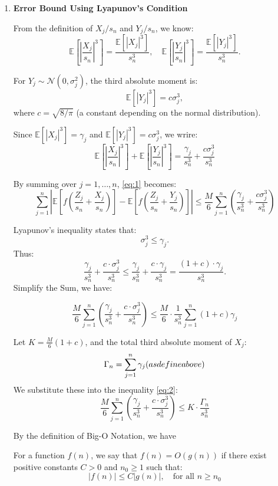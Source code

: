\begin{itemize}
\begin{enumerate}
\item \textbf{Error Bound Using Lyapunov's Condition}

From the definition of \( X_j / s_n \) and \( Y_j / s_n \), we know:
     \[
     \mathbb{E}\left[\left|\frac{X_j}{s_n}\right|^3\right] = \frac{\mathbb{E}[|X_j|^3]}{s_n^3}, \quad \mathbb{E}\left[\left|\frac{Y_j}{s_n}\right|^3\right] = \frac{\mathbb{E}[|Y_j|^3]}{s_n^3}.
     \]

For \( Y_j \sim \mathcal{N}(0, \sigma_j^2) \), the third absolute moment is:
     \[
     \mathbb{E}[|Y_j|^3] = c \sigma_j^3,
     \]
     where \( c = \sqrt{8 / \pi} \) (a constant depending on the normal distribution).

Since \( \mathbb{E}[|X_j|^3] = \gamma_j \) and \(\mathbb{E}[|Y_j|^3] = c \sigma_j^3\), we wrire:
     \[
   \mathbb{E}\left[\left|\frac{X_j}{s_n}\right|^3\right] + \mathbb{E}\left[\left|\frac{Y_j}{s_n}\right|^3\right] = \frac{\gamma_j}{s_n^3} + \frac{c \sigma_j^3}{s_n^3}
   \]

By summing over \(j = 1, \dots , n\), \eqref{eq:1} becomes:
\[
\sum_{j=1}^n \left| \mathbb{E}\left[f\left(\frac{Z_j}{s_n} + \frac{X_j}{s_n}\right)\right] - \mathbb{E}\left[f\left(\frac{Z_j}{s_n} + \frac{Y_j}{s_n}\right)\right] \right| \leq \frac{M}{6} \sum_{j=1}^n \left( \frac{\gamma_j}{s_n^3} + \frac{c \sigma_j^3}{s_n^3} \right)
\]

Lyapunov's inequality states that:
\[
\sigma_j^3 \leq \gamma_j.
\]
Thus:
\[
\frac{\gamma_j}{s_n^3} + \frac{c \cdot \sigma_j^3}{s_n^3} \leq \frac{\gamma_j}{s_n^3} + \frac{c \cdot \gamma_j}{s_n^3} = \frac{(1 + c) \cdot \gamma_j}{s_n^3}.
\]
Simplify the Sum, we have:

\begin{equation} \label{eq:2}
\frac{M}{6} \sum_{j=1}^n \left( \frac{\gamma_j}{s_n^3} + \frac{c \cdot \sigma_j^3}{s_n^3} \right) \leq \frac{M}{6} \cdot \frac{1}{s_n^3} \sum_{j=1}^n (1 + c) \gamma_j
\end{equation}

Let \( K = \frac{M}{6}(1 + c) \), and the total third absolute moment of \( X_j \):
\[
\Gamma_n = \sum_{j=1}^n \gamma_j ( \space as \space define \space above)
\]
We substitute these into the inequality \eqref{eq:2}:
\begin{equation} \label{eq:3}
\frac{M}{6} \sum_{j=1}^n \left( \frac{\gamma_j}{s_n^3} + \frac{c \cdot \sigma_j^3}{s_n^3} \right) \leq K \cdot \frac{\Gamma_n}{s_n^3}
\end{equation}

By the definition of Big-O Notation, we have 
\begin{displayquote}
For a function \( f(n) \), we say that \( f(n) = O(g(n)) \) if there exist positive constants \( C > 0 \) and \( n_0 \geq 1 \) such that:
\[
|f(n)| \leq C |g(n)|, \quad \text{for all } n \geq n_0
\]
\end{displayquote}


\end{enumerate}
\end{itemize}
